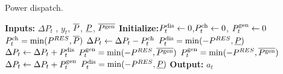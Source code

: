 \documentclass{article}
\begin{document}
\begin{algorithm}[t]
	\caption{Power dispatch.}
	\begin{algorithmic}[1]
		\STATE \textbf{Inputs:} $\Delta P_t$ , $y_t$, $\overline{P}$, $\underline{P}$, $\overline{P^\text{gen}}$
		\STATE \textbf{Initialize:}$P^{\text{dis}}_t \gets 0$,$P^{\text{ch}}_t\gets 0$,  $P^\text{gen}_t\gets 0$
		\STATE $P^{\text{ch}}_t = \min(P^{RES},\overline{P})$ 
		\ENDIF
		\STATE $\Delta P_t \leftarrow \Delta P_t - P^{\text{ch}}_t$
		\ELSE
		\STATE $P^{\text{dis}}_t = \min(-P^{RES},\underline{P})$ 
		\STATE $\Delta P_t \leftarrow \Delta P_t +P^{\text{dis}}_t$
		\STATE $P^\text{gen}_t=\min(-P^{RES},\overline{P^\text{gen}})$ 
		\ENDIF
		\STATE $P^\text{gen}_t=\min(-P^{RES},\overline{P^\text{gen}})$ 
		\STATE $\Delta P_t \leftarrow \Delta P_t + P^\text{gen}_t$
		\STATE $P^{\text{dis}}_t = \min(-P^{RES},\underline{P})$ 
		\ENDIF
		\ENDIF
	\STATE \textbf{Output:} $a_t$
	\end{algorithmic}
	\label{algoRBC}
\end{algorithm}
\end{document}
